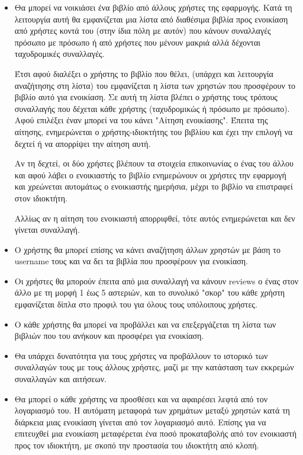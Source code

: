 \documentclass[12pt,a4paper]{article}
\begin{document}
\begin{itemize}
	\item Θα μπορεί να νοικιάσει ένα βιβλίο από άλλους χρήστες της εφαρμογής. Κατά τη λειτουργία αυτή θα εμφανίζεται μια λίστα από διαθέσιμα βιβλία προς ενοικίαση από χρήστες κοντά του (στην ίδια πόλη με αυτόν) που κάνουν συναλλαγές πρόσωπο με πρόσωπο ή από χρήστες που μένουν μακριά αλλά δέχονται ταχυδρομικές συναλλαγές. 

Έτσι αφού διαλέξει ο χρήστης το βιβλίο που θέλει, (υπάρχει και λειτουργία αναζήτησης στη λίστα) του εμφανίζεται η λίστα των χρηστών που προσφέρουν το βιβλίο αυτό για ενοικίαση. Σε αυτή τη λίστα βλέπει ο χρήστης τους τρόπους συναλλαγής που δέχεται κάθε χρήστης (ταχυδρομικώς ή πρόσωπο με πρόσωπο). Αφού επιλέξει έναν μπορεί να του κάνει "Αίτηση ενοικίασης". Έπειτα της αίτησης, ενημερώνεται ο χρήστης-ιδιοκτήτης του βιβλίου και έχει την επιλογή να δεχτεί ή να απορρίψει την αίτηση αυτή.

Αν τη δεχτεί, οι δύο χρήστες βλέπουν τα στοιχεία επικοινωνίας ο ένας του άλλου και αφού λάβει ο ενοικιαστής το βιβλίο ενημερώνουν οι χρήστες την εφαρμογή και χρεώνεται αυτομάτως ο ενοικιαστής ημερήσια, μέχρι το βιβλίο να επιστραφεί στον ιδιοκτήτη. 

Αλλίως αν η αίτηση του ενοικιαστή απορριφθεί, τότε αυτός ενημερώνεται και δεν γίνεται συναλλαγή.

	\item Ο χρήστης θα μπορεί επίσης να κάνει αναζήτηση άλλων χρηστών με βάση το username τους και να δει τα βιβλία που προσφέρουν για ενοικίαση.

	\item Οι χρήστες θα μπορούν έπειτα από μια συναλλαγή να κάνουν reviews ο ένας στον άλλο με τη μορφή 1 έως 5 αστεριών, και το συνολικό "σκορ" του κάθε χρήστη εμφανίζεται δίπλα στο προφιλ του για όλους τους υπόλοιπους χρήστες.

	\item Ο κάθε χρήστης θα μπορεί να προβάλλει και να επεξεργάζεται τη λίστα των βιβλιών που του ανήκουν και προσφέρει για ενοικίαση.

	\item Θα υπάρχει δυνατότητα για τους χρήστες να προβάλλουν το ιστορικό των συναλλαγών τους με τους άλλους χρήστες, μαζί με την κατάσταση των εκκρεμών συναλλαγών και αιτήσεων.

	\item Θα μπορεί ο κάθε χρήστης να προσθέσει και να αφαιρέσει λεφτά από τον λογαριασμό του. Η αυτόματη μεταφορά των χρημάτων μεταξύ χρηστών κατά τη διάρκεια μιας ενοικίαση γίνεται από τον λογαριασμό αυτό. Επίσης για να επιτευχθεί μια ενοικίαση μεταφέρεται ένα ποσό προκαταβολής από τον ενοικιαστή προς τον ιδιοκτήτη, με σκοπό την προστασία του ιδιοκτήτη από κλοπή.


\end{itemize}
\end{document}
